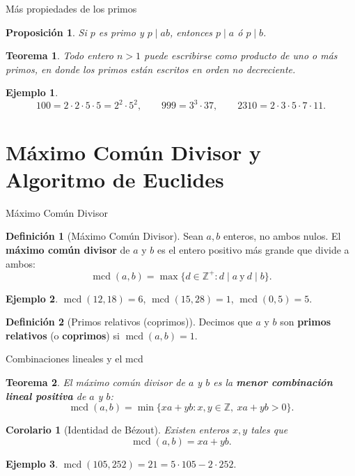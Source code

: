 \documentclass[10pt,aspectratio=169]{beamer}
\theoremstyle{definition}
\newtheorem{definicion}{Definición}
\newtheorem{ejemplo}{Ejemplo}
\theoremstyle{plain}
\newtheorem{teorema}{Teorema}
\newtheorem{proposicion}{Proposición}
\newtheorem{corolario}{Corolario}
\theoremstyle{remark}
\newcommand{\Z}{\mathbb{Z}}
\newcommand{\mcd}{\operatorname{mcd}}
\begin{document}
\begin{frame}{Más propiedades de los primos}
  \begin{proposicion}
    Si $p$ es primo y $p\mid ab$, entonces $p\mid a$ ó $p\mid b$.
  \end{proposicion}
  \begin{teorema}
    Todo entero $n>1$ puede escribirse como producto de uno o más primos,
    en donde los primos están escritos en orden no decreciente.
  \end{teorema}
  \begin{ejemplo}
    \[
      100 = 2\cdot 2\cdot 5\cdot 5 = 2^2\cdot 5^2,\qquad
      999 = 3^3\cdot 37,\qquad
      2310 = 2\cdot 3\cdot 5\cdot 7\cdot 11.
    \]
  \end{ejemplo}
\end{frame}

\section{Máximo Común Divisor y Algoritmo de Euclides}
\begin{frame}{Máximo Común Divisor}
  \begin{definicion}[Máximo Común Divisor]
    Sean $a,b$ enteros, no ambos nulos. El \textbf{máximo común divisor}
    de $a$ y $b$ es el entero positivo más grande que divide a ambos:
    \[
      \mcd(a,b) = \max\{d\in\Z^+ : d\mid a\ \text{y}\ d\mid b\}.
    \]
  \end{definicion}
  \begin{ejemplo}
    $\mcd(12,18)=6$, $\mcd(15,28)=1$, $\mcd(0,5)=5$.
  \end{ejemplo}
  \begin{definicion}[Primos relativos (coprimos)]
    Decimos que $a$ y $b$ son \textbf{primos relativos} (o
    \textbf{coprimos}) si $\mcd(a,b)=1$.
  \end{definicion}
\end{frame}

\begin{frame}{Combinaciones lineales y el mcd}
  \begin{teorema}
    El máximo común divisor de $a$ y $b$ es la \textbf{menor combinación
    lineal positiva} de $a$ y $b$:
    \[
      \mcd(a,b) = \min\{xa+yb : x,y\in\Z,\ xa+yb > 0\}.
    \]
  \end{teorema}
  \begin{corolario}[Identidad de Bézout]
    Existen enteros $x,y$ tales que
    \[
      \mcd(a,b) = xa + yb.
    \]
  \end{corolario}
  \begin{ejemplo}
    $\mcd(105,252) = 21 = 5\cdot 105 - 2\cdot 252$.
  \end{ejemplo}
\end{frame}
\end{document}
